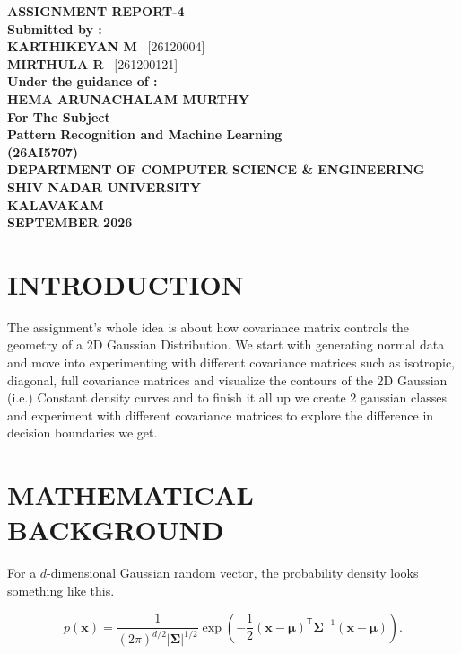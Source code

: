 \documentclass[12pt]{article}
\newcommand{\studentname}{KARTHIKEYAN M}
\newcommand{\registernumber}{26120004}
\newcommand{\teammatename}{MIRTHULA R}
\newcommand{\teammateregister}{261200121}
\newcommand{\submissionmonth}{SEPTEMBER 2026}
\begin{document}
\begin{titlepage}
\centering
\vspace*{2cm}
{\Large \textbf{ASSIGNMENT REPORT-4}}\\[2cm]

\textbf{Submitted by :}\\[0.3cm]
\textbf{\studentname} \ [\registernumber]\\[0.3cm]
\textbf{\teammatename} \ [\teammateregister]\\[2cm]

\textbf{Under the guidance of :}\\[0.3cm]
\textbf{HEMA ARUNACHALAM MURTHY}\\[1.5cm]

\textbf{For The Subject}\\[0.5cm]
{\Large \textbf{Pattern Recognition and Machine Learning}}\\[0.3cm]
\textbf{(26AI5707)}\\[3cm]

\vfill
\textbf{DEPARTMENT OF COMPUTER SCIENCE \& ENGINEERING}\\[0.3cm]
\textbf{SHIV NADAR UNIVERSITY}\\[0.3cm]
\textbf{KALAVAKAM}\\[1.5cm]
\textbf{\submissionmonth}
\end{titlepage}

\section*{INTRODUCTION}

The assignment's whole idea is about how covariance matrix controls the geometry of a 2D Gaussian Distribution. We start with generating normal data and move into experimenting with different covariance matrices such as isotropic, diagonal, full covariance matrices and visualize the contours of the 2D Gaussian (i.e.) Constant density curves and to finish it all up we create 2 gaussian classes and experiment with different covariance matrices to explore the difference in decision boundaries we get.

\section*{MATHEMATICAL BACKGROUND}

For a $d$-dimensional Gaussian random vector, the probability density looks something like this.

\begin{equation}
  p(\mathbf{x}) =
  \frac{1}{(2\pi)^{d/2}|\boldsymbol{\Sigma}|^{1/2}}
  \exp\left(
    -\frac{1}{2}
    (\mathbf{x}-\boldsymbol{\mu})^{\mathsf T}
    \boldsymbol{\Sigma}^{-1}
    (\mathbf{x}-\boldsymbol{\mu})
  \right).
  \label{eq:multivariate-gaussian}
\end{equation}
\end{document}
